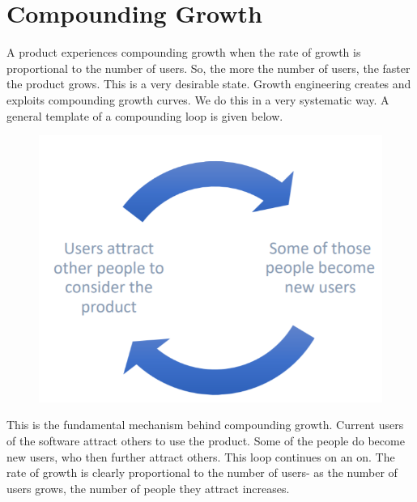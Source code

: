 \documentclass[a4paper, openany]{memoir}
\begin{document}
\section{Compounding Growth}
A product experiences compounding growth when the rate of growth is proportional to the number of users. So, the more the number of users, the faster the product grows. This is a very desirable state. 
Growth engineering creates and exploits compounding growth curves. We do this in a very systematic way. A general template of a compounding loop is given below.
\begin{figure}[H]
    \centering
    \includegraphics[scale=0.5]{src/18.1 Generic growth loop.PNG}
\end{figure}
\noindent This is the fundamental mechanism behind compounding growth. Current users of the software attract others to use the product. Some of the people do become new users, who then further attract others. This loop continues on an on. The rate of growth is clearly proportional to the number of users- as the number of users grows, the number of people they attract increases. 
\end{document}
